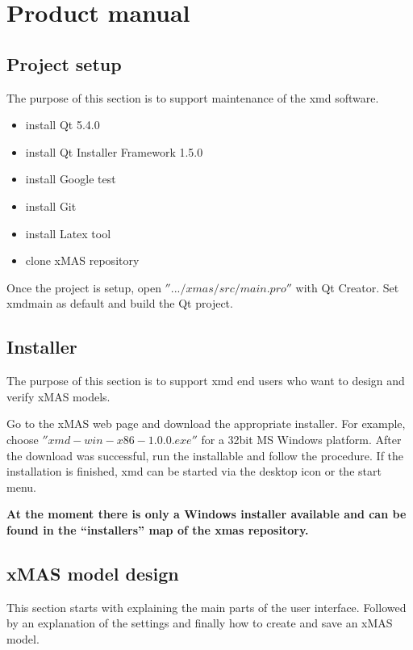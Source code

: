 \chapter{Product manual}

\section{Project setup}
The purpose of this section is to support maintenance of the xmd software.

\begin{itemize}
\item install Qt 5.4.0
\item install Qt Installer Framework 1.5.0
\item install Google test
\item install Git
\item install Latex tool
\item clone xMAS repository
\end{itemize}

Once the project is setup, open $''.../xmas/src/main.pro''$ with Qt Creator.
Set xmdmain as default and build the Qt project.

\section{Installer}
The purpose of this section is to support xmd end users who want to design and verify xMAS models.

Go to the xMAS web page and download the appropriate installer. For example,
choose $''xmd-win-x86-1.0.0.exe''$ for a 32bit MS Windows platform. After
the download was successful, run the installable and follow the procedure.
If the installation is finished, xmd can be started via the desktop icon or the start menu.

\begin{tcolorbox}[colback=white]
\textbf{
At the moment there is only a Windows installer available and can be found in
the ``installers'' map of the xmas repository.
}
\end{tcolorbox}

\section{xMAS model design}
This section starts with explaining the main parts of the user interface.
Followed by an explanation of the settings and finally how to create and save an
xMAS model.

